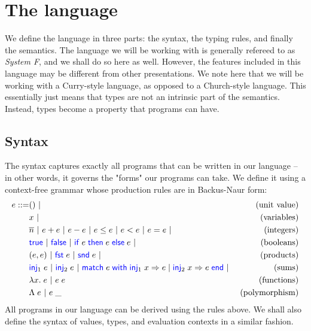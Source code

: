 \documentclass[twoside,11pt,openright]{report}
\theoremstyle{definition}
\newcommand{\BNFdef}{::=}
\newcommand{\ALT}{~|~}
\newcommand{\Keyword}[1]{{\color{blue} \mathsf{#1}}}
\newcommand{\var}{x}
\newcommand{\expr}{e}
\newcommand{\TT}{()}
\newcommand{\Num}[1]{\overline{#1}}
\newcommand{\True}{\Keyword{true}}
\newcommand{\False}{\Keyword{false}}
\newcommand{\IfCmd}{\Keyword{if}}
\newcommand{\ThenCmd}{\Keyword{then}}
\newcommand{\ElseCmd}{\Keyword{else}}
\def\If#1then#2else#3{\IfCmd{}\;#1\;\ThenCmd{}\;#2\;\ElseCmd{}\;#3}
\newcommand{\Fst}{\Keyword{fst}\;}
\newcommand{\Snd}{\Keyword{snd}\;}
\newcommand{\Inj}[1]{\Keyword{inj}_{#1}\;}
\newcommand{\MatchCmd}{\Keyword{match}}
\newcommand{\WithCmd}{\Keyword{with}}
\newcommand{\EndCmd}{\Keyword{end}}
\def\Match#1with#2=>#3|#4=>#5end{\MatchCmd{}\;#1\;\WithCmd{}\;#2\Rightarrow#3 \;|\;#4\Rightarrow#5\;\EndCmd{}}
\newcommand{\Tlam}{\Lambda\;}
\newcommand{\Tapp}[1]{#1\;\_}
\begin{document}
\section{The language}
We define the language in three parts: the syntax, the typing rules, and finally the semantics. The language we will be working with is generally refereed to as \textit{System F}, and we shall do so here as well. However, the features included in this language may be different from other presentations. We note here that we will be working with a Curry-style language, as opposed to a Church-style language. This essentially just means that types are not an intrinsic part of the semantics. Instead, types become a property that programs can have.
\subsection{Syntax}
The syntax captures exactly all programs that can be written in our language – in other words, it governs the "forms" our programs can take. We define it using a context-free grammar whose production rules are in Backus-Naur form:
\begin{align*}
  \expr \BNFdef & \TT \ALT & \text{(unit value)}\\
                & \var \ALT & \text{(variables)}\\
                & \Num{n} \ALT \expr + \expr \ALT \expr - \expr \ALT
                  \expr \le \expr \ALT \expr < \expr \ALT 
                  \expr = \expr \ALT & \text{(integers)}\\
                & \True \ALT \False \ALT {\If \expr then \expr else \expr} \ALT
                  & \text{(booleans)}\\
                & (\expr, \expr) \ALT \Fst \expr \ALT \Snd \expr \ALT
                  & \text{(products)}\\
                & \Inj{1} \expr \ALT \Inj{2} \expr \ALT 
                  \Match \expr with \Inj{1} \var => \expr | \Inj{2} \var => \expr end \ALT
                  & \text{(sums)}\\
                & \fun \var . \expr \ALT \expr \; \expr
                  & \text{(functions)}\\
                & \Tlam \expr \ALT \Tapp{\expr} & \text{(polymorphism)}
\end{align*}
All programs in our language can be derived using the rules above. We shall also define the syntax of values, types, and evaluation contexts in a similar fashion.
\end{document}
